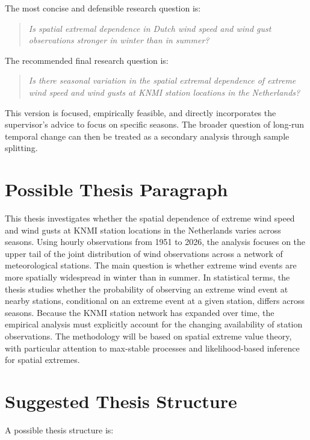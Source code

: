 \documentclass[11pt,a4paper]{article}
\begin{document}
The most concise and defensible research question is:

\begin{quote}
    \emph{Is spatial extremal dependence in Dutch wind speed and wind gust observations stronger in winter than in summer?}
\end{quote}

The recommended final research question is:

\begin{quote}
    \emph{Is there seasonal variation in the spatial extremal dependence of extreme wind speed and wind gusts at KNMI station locations in the Netherlands?}
\end{quote}

This version is focused, empirically feasible, and directly incorporates the supervisor's advice to focus on specific seasons. The broader question of long-run temporal change can then be treated as a secondary analysis through sample splitting.

\section{Possible Thesis Paragraph}

This thesis investigates whether the spatial dependence of extreme wind speed and wind gusts at KNMI station locations in the Netherlands varies across seasons. Using hourly observations from 1951 to 2026, the analysis focuses on the upper tail of the joint distribution of wind observations across a network of meteorological stations. The main question is whether extreme wind events are more spatially widespread in winter than in summer. In statistical terms, the thesis studies whether the probability of observing an extreme wind event at nearby stations, conditional on an extreme event at a given station, differs across seasons. Because the KNMI station network has expanded over time, the empirical analysis must explicitly account for the changing availability of station observations. The methodology will be based on spatial extreme value theory, with particular attention to max-stable processes and likelihood-based inference for spatial extremes.

\section{Suggested Thesis Structure}

A possible thesis structure is:
\end{document}
